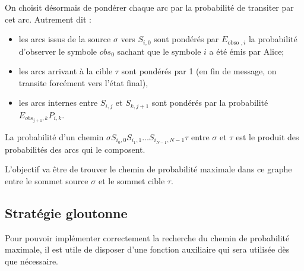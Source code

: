 On choisit désormais de pondérer chaque arc par la probabilité de transiter par cet arc. Autrement dit :

\begin{itemize}
  \item les arcs issus de la source $\sigma$ vers $S_{i, 0}$ sont pondérés par $E_{\text {obso }, i}$ la probabilité d'observer le symbole $o b s_{0}$ sachant que le symbole $i$ a été émis par Alice;
  \item les arcs arrivant à la cible $\tau$ sont pondérés par 1 (en fin de message, on transite forcément vers l'état final),
  \item les arcs internes entre $S_{i, j}$ et $S_{k, j+1}$ sont pondérés par la probabilité $E_{o b s_{j+1}, k} P_{i, k}$.
\end{itemize}

La probabilité d'un chemin $\sigma S_{i_{0}, 0} S_{i_{1}, 1} \ldots S_{i_{N-1}, N-1} \tau$ entre $\sigma$ et $\tau$ est le produit des probabilités des arcs qui le composent.

L'objectif va être de trouver le chemin de probabilité maximale dans ce graphe entre le sommet source $\sigma$ et le sommet cible $\tau$.\\[0pt]



\subsection{Stratégie gloutonne}
Pour pouvoir implémenter correctement la recherche du chemin de probabilité maximale, il est utile de disposer d'une fonction auxiliaire qui sera utilisée dès que nécessaire.



